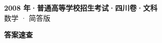 \documentclass[zihao=-4, a4paper]{ctexart}
\begin{document}
\begin{center}
  {\Large\bfseries 2008 年·普通高等学校招生考试·四川卷·文科}\\[4pt]
  {\large 数学 · 简答版}
\end{center}
\medskip
{}

\clearpage
{}
\begin{center}{\Large\bfseries 答案速查}\end{center}
\medskip

\end{document}
